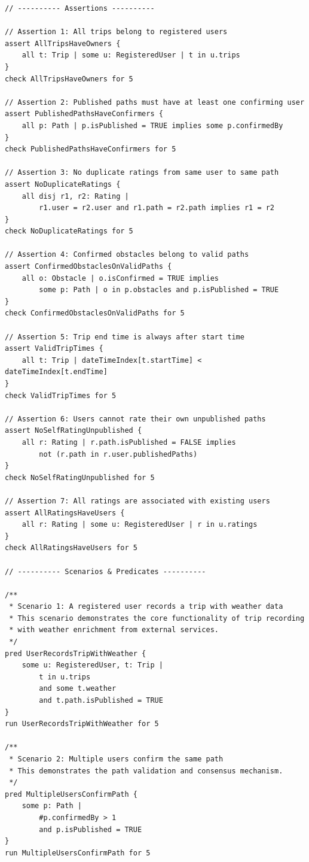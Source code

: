 \begin{lstlisting}
// ---------- Assertions ----------

// Assertion 1: All trips belong to registered users
assert AllTripsHaveOwners {
    all t: Trip | some u: RegisteredUser | t in u.trips
}
check AllTripsHaveOwners for 5

// Assertion 2: Published paths must have at least one confirming user
assert PublishedPathsHaveConfirmers {
    all p: Path | p.isPublished = TRUE implies some p.confirmedBy
}
check PublishedPathsHaveConfirmers for 5

// Assertion 3: No duplicate ratings from same user to same path
assert NoDuplicateRatings {
    all disj r1, r2: Rating |
        r1.user = r2.user and r1.path = r2.path implies r1 = r2
}
check NoDuplicateRatings for 5

// Assertion 4: Confirmed obstacles belong to valid paths
assert ConfirmedObstaclesOnValidPaths {
    all o: Obstacle | o.isConfirmed = TRUE implies
        some p: Path | o in p.obstacles and p.isPublished = TRUE
}
check ConfirmedObstaclesOnValidPaths for 5

// Assertion 5: Trip end time is always after start time
assert ValidTripTimes {
    all t: Trip | dateTimeIndex[t.startTime] < dateTimeIndex[t.endTime]
}
check ValidTripTimes for 5

// Assertion 6: Users cannot rate their own unpublished paths
assert NoSelfRatingUnpublished {
    all r: Rating | r.path.isPublished = FALSE implies
        not (r.path in r.user.publishedPaths)
}
check NoSelfRatingUnpublished for 5

// Assertion 7: All ratings are associated with existing users
assert AllRatingsHaveUsers {
    all r: Rating | some u: RegisteredUser | r in u.ratings
}
check AllRatingsHaveUsers for 5

// ---------- Scenarios & Predicates ----------

/**
 * Scenario 1: A registered user records a trip with weather data
 * This scenario demonstrates the core functionality of trip recording
 * with weather enrichment from external services.
 */
pred UserRecordsTripWithWeather {
    some u: RegisteredUser, t: Trip |
        t in u.trips
        and some t.weather
        and t.path.isPublished = TRUE
}
run UserRecordsTripWithWeather for 5

/**
 * Scenario 2: Multiple users confirm the same path
 * This demonstrates the path validation and consensus mechanism.
 */
pred MultipleUsersConfirmPath {
    some p: Path |
        #p.confirmedBy > 1
        and p.isPublished = TRUE
}
run MultipleUsersConfirmPath for 5


\end{lstlisting}
